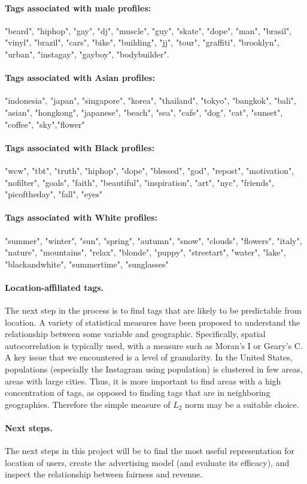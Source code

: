 \paragraph{Tags associated with male profiles:} "beard", "hiphop", "gay", "dj", "muscle", "guy", "skate", "dope", "man", "brasil", "vinyl", "brazil", "cars", "bike", "building", "jj", "tour", "graffiti", "brooklyn", "urban", "instagay", "gayboy", "bodybuilder".
\paragraph{Tags associated with Asian profiles:} "indonesia", "japan", "singapore", "korea", "thailand", "tokyo", "bangkok", "bali", "asian", "hongkong", "japanese", "beach", "sea", "cafe", "dog", "cat", "sunset", "coffee", "sky","flower"
\paragraph{Tags associated with Black profiles:} "wcw", "tbt", "truth", "hiphop", "dope", "blessed", "god", "repost", "motivation", "nofilter", "goals", "faith", "beautiful", "inspiration", "art", "nyc", "friends", "picoftheday", "fall", "eyes"
\paragraph{Tags associated with White profiles:} "summer", "winter", "sun", "spring", "autumn", "snow", "clouds", "flowers", "italy", "nature", "mountains", "relax", "blonde", "puppy", "streetart", "water", "lake", "blackandwhite", "summertime", "sunglasses"

\paragraph{Location-affiliated tags.}
The next step in the process is to find tags that are likely to be predictable from location.
A variety of statistical measures have been proposed to understand the relationship between some variable and geographic.
Specifically, spatial autocorrelation is typically used, with a measure such as Moran's I or Geary's C.
A key issue that we encountered is a level of granularity.
In the United States, populations (especially the Instagram using population) is clustered in few areas, areas with large cities.
Thus, it is more important to find areas with a high concentration of tags, as opposed to finding tags that are in neighboring geographies.
Therefore the simple measure of $L_2$ norm may be a suitable choice.

\paragraph{Next steps.}
The next steps in this project will be to find the most useful representation for location of users, create the advertising model (and evaluate its efficacy), and inspect the relationship between fairness and revenue.

